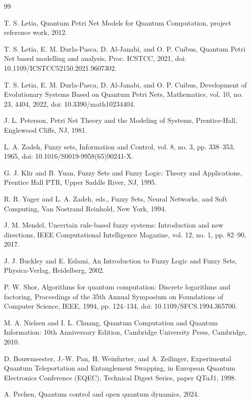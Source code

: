 \documentclass[final,3p,times]{elsarticle}
\begin{document}
\begin{thebibliography}{99}

 T. S. Letia, Quantum Petri Net Models for Quantum Computation, project reference work, 2012.

 T. S. Letia, E. M. Durla-Pasca, D. Al-Janabi, and O. P. Cuibus, Quantum Petri Net based modelling and analysis, Proc. ICSTCC, 2021, doi: 10.1109/ICSTCC52150.2021.9607302.

 T. S. Letia, E. M. Durla-Pasca, D. Al-Janabi, and O. P. Cuibus, Development of Evolutionary Systems Based on Quantum Petri Nets, Mathematics, vol. 10, no. 23, 4404, 2022, doi: 10.3390/math10234404.

 J. L. Peterson, Petri Net Theory and the Modeling of Systems, Prentice-Hall, Englewood Cliffs, NJ, 1981.

 L. A. Zadeh, Fuzzy sets, Information and Control, vol. 8, no. 3, pp. 338--353, 1965, doi: 10.1016/S0019-9958(65)90241-X.

 G. J. Klir and B. Yuan, Fuzzy Sets and Fuzzy Logic: Theory and Applications, Prentice Hall PTR, Upper Saddle River, NJ, 1995.

 R. R. Yager and L. A. Zadeh, eds., Fuzzy Sets, Neural Networks, and Soft Computing, Van Nostrand Reinhold, New York, 1994.

 J. M. Mendel, Uncertain rule-based fuzzy systems: Introduction and new directions, IEEE Computational Intelligence Magazine, vol. 12, no. 1, pp. 82--90, 2017.

 J. J. Buckley and E. Eslami, An Introduction to Fuzzy Logic and Fuzzy Sets, Physica-Verlag, Heidelberg, 2002.

 P. W. Shor, Algorithms for quantum computation: Discrete logarithms and factoring, Proceedings of the 35th Annual Symposium on Foundations of Computer Science, IEEE, 1994, pp. 124--134, doi: 10.1109/SFCS.1994.365700.

 M. A. Nielsen and I. L. Chuang, Quantum Computation and Quantum Information: 10th Anniversary Edition, Cambridge University Press, Cambridge, 2010.

 D. Bouwmeester, J.-W. Pan, H. Weinfurter, and A. Zeilinger, Experimental Quantum Teleportation and Entanglement Swapping, in European Quantum Electronics Conference (EQEC), Technical Digest Series, paper QTuJ1, 1998.

 A. Pechen, Quantum control and open quantum dynamics, 2024.


\end{thebibliography}
\end{document}
